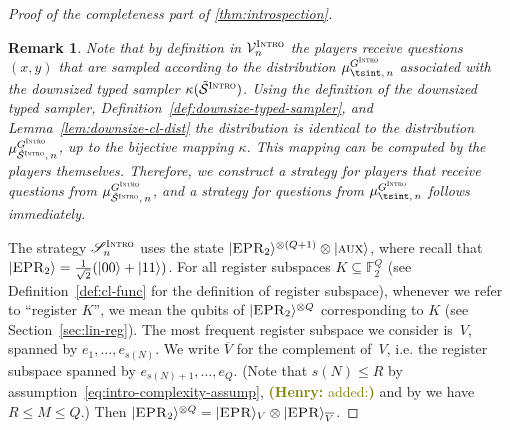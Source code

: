 \documentclass[11pt]{article}
\newtheorem{remark}[theorem]{Remark}
\theoremstyle{definition}
\newcommand{\ket}[1]{|#1\rangle}
\newcommand{\F}{\ensuremath{\mathbb{F}}}
\newcommand{\downsize}{\kappa}
\newcommand{\sampler}{\mathcal{S}}
\newcommand{\verifier}{\mathcal{V}}
\newcommand{\strategy}{\mathscr{S}}
\newcommand{\gamestyle}[1]{\ensuremath{\textsc{#1}}\xspace}
\newcommand{\intro}{\gamestyle{Intro}}
\newcommand{\labelstyle}[1]{\ensuremath{\textsc{#1}}\xspace}
\newcommand{\EPR}{\labelstyle{EPR}}
\newcommand{\aux}{\labelstyle{aux}}
\newcommand{\hnote}[1]{\textcolor{olive}{\small {\textbf{(Henry:} #1\textbf{) }}}}
\newcommand{\hnote}[1]{}
\begin{document}
\begin{proof}[Proof of the completeness part of \cref{thm:introspection}]
  \begin{remark}
    \label{rk:downsizing}
    Note that by definition in $\verifier_n^\intro$ the players receive
    questions $(x,y)$ that are sampled according to the distribution
    $\mu_{\tsint,\, n}^{G^\intro}$ associated with the downsized typed
    sampler $\downsize(\tilde{\sampler}^\intro)$.
    Using the definition of the downsized typed sampler,
    Definition~\ref{def:downsize-typed-sampler}, and
    Lemma~\ref{lem:downsize-cl-dist} the distribution is identical to the
    distribution $\mu_{\tilde{\sampler}^\intro,\, n}^{G^\intro}$, up to the
    bijective mapping $\downsize$.
    This mapping can be computed by the players themselves.
    Therefore, we construct a strategy for players that receive questions from
    $\mu_{\tilde{\sampler}^\intro,\, n}^{G^\intro}$, and a strategy for
    questions from $\mu_{\tsint,\, n}^{G^\intro}$ follows immediately.
  \end{remark}

  The strategy $\strategy^\intro_n$ uses the state $\ket{\EPR_2}^{\otimes (Q+1)}
  \otimes \ket{\aux}$, where recall that $\ket{\EPR_2} =
  \frac{1}{\sqrt{2}}(\ket{00}+\ket{11})$.
  For all register subspaces $K \subseteq \F_2^{Q}$ (see
  Definition~\ref{def:cl-func} for the definition of register subspace),
  whenever we refer to ``register $K$'', we mean the qubits of
  $\ket{\EPR_2}^{\otimes Q}$ corresponding to $K$ (see
  Section~\ref{sec:lin-reg}).
  The most frequent register subspace we consider is~$V$, spanned by $e_1,
  \ldots, e_{s(N)}$.
  We write $\overline{V}$ for the complement of~$V$, i.e.
  the register subspace spanned by $e_{s(N)+1}, \ldots, e_{Q}$.
  (Note that $s(N) \leq R$ by
  assumption~\eqref{eq:intro-complexity-assump}, \hnote{added:} and by  we have $R \leq M \leq Q$.)
  Then $\ket{\EPR_2}^{\otimes Q} = \ket{\EPR}_V \otimes
  \ket{\EPR}_{\overline{V}}$.


\end{proof}
\end{document}
